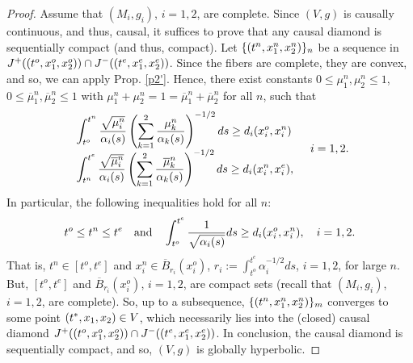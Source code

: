 \begin{proof}
Assume that $(M_{i},g_{i})$, $i=1,2$, are complete. Since $(V,g)$ is causally continuous, and thus, causal, it suffices to prove that any causal diamond is sequentially compact (and thus, compact). Let $\{(t^n,x_1^n,x_2^n)\}_n$ be a sequence in $J^+((t^o,x_1^o,x_2^o))\cap J^-((t^e,x_1^e,x_2^e))$. Since the fibers are complete, they are convex, and so, we can apply Prop. \ref{p2'}. Hence, there exist constants $0\leq\mu_{1}^{n},\mu_{2}^{n}\leq 1$, $0\leq\overline{\mu}_{1}^{n},\overline{\mu}_{2}^{n}\leq 1$ with $\mu_{1}^{n}+\mu_{2}^{n}=1=\overline{\mu}_{1}^{n}+\overline{\mu}_{2}^{n}$ for all $n$, such that
\[
  \begin{array}{l}
\displaystyle\int_{t^{o}}^{t^n} \frac{\sqrt{\mu_{i}^{n}}}{\alpha_{i}(s)}\left(\sum_{k=1}^{2} \frac{\mu_{k}^{n}}{\alpha_{k}(s)} \right)^{-1/2}ds \geq d_{i}(x_{i}^{o},x_{i}^{n})   \\
\displaystyle\int_{t^{n}}^{t^e} \frac{\sqrt{\overline{\mu}_{i}^{n}}}{\alpha_{i}(s)}\left(\sum_{k=1}^{2} \frac{\overline{\mu}_{k}^{n}}{\alpha_{k}(s)} \right)^{-1/2}ds \geq d_{i}(x_{i}^{n},x_{i}^{e}),
  \end{array}\quad i=1,2.
\]
In particular, the following inequalities hold for all $n$:
\[
t^o\leq t^n\leq t^e\quad\hbox{and}\quad\int_{t^{o}}^{t^e}\frac{1}{\sqrt{\alpha_i(s)}}ds \geq d_{i}(x_{i}^{o},x_{i}^{n}),\quad i=1,2.
\]
That is, $t^n \in [t^o,t^e]$ and $x_i^{n} \in \overline{B}_{r_i}(x_i^o)$, $r_i:=\int_{t^{o}}^{t^e}\alpha_i^{-1/2}ds$, $i=1,2$, for large $n$.
But, $[t^o,t^e]$ and $\overline{B}_{r_i}(x_i^o)$, $i=1,2$, are compact sets (recall that $(M_{i},g_{i})$, $i=1,2$, are complete). So,
up to a subsequence, $\{(t^n,x_1^n,x_2^n)\}_m$ converges to some point $(t^*,x_{1},x_{2})\in V$, which necessarily lies into the (closed) causal diamond $J^+((t^o,x_1^o,x_2^o)) \cap J^-((t^e,x_1^e,x_2^e))$. In conclusion, the causal diamond is sequentially compact, and so, $(V,g)$ is globally hyperbolic.
\end{proof}

